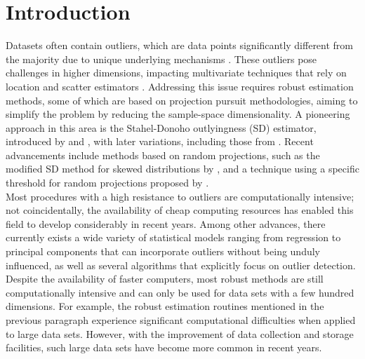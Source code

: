 \documentclass[12pt]{article}
\begin{document}
\newpage

\section{Introduction}

Datasets often contain outliers, which are data points significantly different from the majority due to unique underlying mechanisms \citep{Maronna2006}. These outliers pose challenges in higher dimensions, impacting multivariate techniques that rely on location and scatter estimators \citep{PeñaPrieto2001b}. Addressing this issue requires robust estimation methods, some of which are based on projection pursuit methodologies, aiming to simplify the problem by reducing the sample-space dimensionality. A pioneering approach in this area is the Stahel-Donoho outlyingness (SD) estimator, introduced by \citet{Stahel1981} and \citet{Donoho1982}, with later variations, including those from \citet{vanAelst2016}. Recent advancements include methods based on random projections, such as the modified SD method for skewed distributions by \citet{Hubert2008}, and a technique using a specific threshold for random projections proposed by \citet{Navarro2021}.\\

Most procedures with a high resistance to outliers are computationally intensive; not coincidentally, the availability of cheap computing resources has enabled this field to develop considerably in recent years. Among other advances, there currently exists a wide variety of statistical models ranging from regression to principal components \citep{Hubert2005} that can incorporate outliers without being unduly influenced, as well as several algorithms that explicitly focus on outlier detection. Despite the availability of faster computers, most robust methods are still computationally intensive and can only be used for data sets with a few hundred dimensions. For example, the robust estimation routines mentioned in the previous paragraph experience significant computational difficulties when applied to large data sets. However, with the improvement of data collection and storage facilities, such large data sets have become more common in recent years.\\
\end{document}
